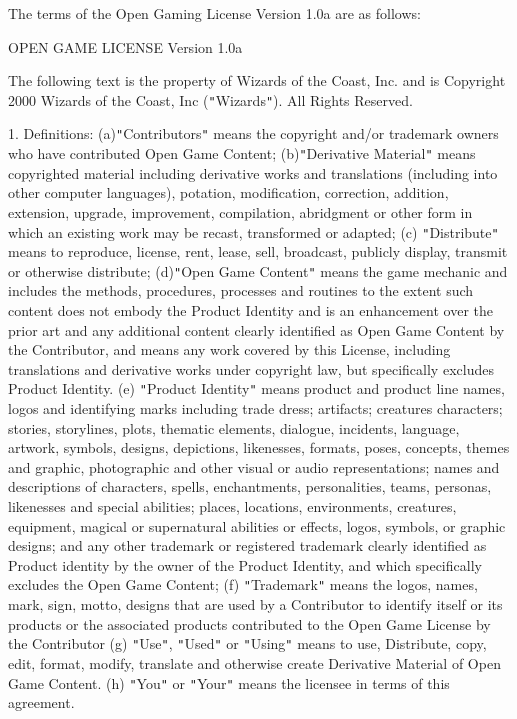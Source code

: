 \documentclass{article}
\begin{document}
\vspace{12pt}
The terms of the Open Gaming License Version 1.0a are as follows: 

\vspace{12pt}
OPEN GAME LICENSE Version 1.0a 

\vspace{12pt}
The following text is the property of Wizards of the Coast, Inc. and is Copyright 
2000 Wizards of the Coast, Inc (\texttt{"}Wizards\texttt{"}). All Rights Reserved. 

\vspace{12pt}
1. Definitions: (a)\texttt{"}Contributors\texttt{"} means the copyright and/or 
trademark owners who have contributed Open Game Content; (b)\texttt{"}Derivative 
Material\texttt{"} means copyrighted material including derivative works and translations 
(including into other computer languages), potation, modification, correction, 
addition, extension, upgrade, improvement, compilation, abridgment or other form 
in which an existing work may be recast, transformed or adapted; (c) \texttt{"}Distribute\texttt{"} 
means to reproduce, license, rent, lease, sell, broadcast, publicly display, transmit 
or otherwise distribute; (d)\texttt{"}Open Game Content\texttt{"} means the game 
mechanic and includes the methods, procedures, processes and routines to the extent 
such content does not embody the Product Identity and is an enhancement over the 
prior art and any additional content clearly identified as Open Game Content by 
the Contributor, and means any work covered by this License, including translations 
and derivative works under copyright law, but specifically excludes Product Identity. 
(e) \texttt{"}Product Identity\texttt{"} means product and product line names, 
logos and identifying marks including trade dress; artifacts; creatures characters; 
stories, storylines, plots, thematic elements, dialogue, incidents, language, artwork, 
symbols, designs, depictions, likenesses, formats, poses, concepts, themes and 
graphic, photographic and other visual or audio representations; names and descriptions 
of characters, spells, enchantments, personalities, teams, personas, likenesses 
and special abilities; places, locations, environments, creatures, equipment, magical 
or supernatural abilities or effects, logos, symbols, or graphic designs; and any 
other trademark or registered trademark clearly identified as Product identity 
by the owner of the Product Identity, and which specifically excludes the Open 
Game Content; (f) \texttt{"}Trademark\texttt{"} means the logos, names, mark, sign, 
motto, designs that are used by a Contributor to identify itself or its products 
or the associated products contributed to the Open Game License by the Contributor 
(g) \texttt{"}Use\texttt{"}, \texttt{"}Used\texttt{"} or \texttt{"}Using\texttt{"} 
means to use, Distribute, copy, edit, format, modify, translate and otherwise create 
Derivative Material of Open Game Content. (h) \texttt{"}You\texttt{"} or \texttt{"}Your\texttt{"} 
means the licensee in terms of this agreement. 
\end{document}
